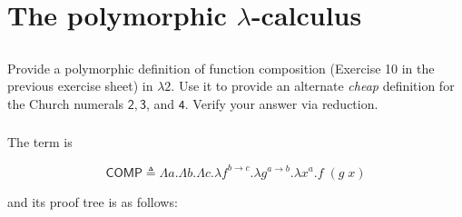 \documentclass{article}
\begin{document}
\section*{The polymorphic $\lambda$-calculus}

\subsection{}\label{ex:6}

Provide a polymorphic definition of function composition
(Exercise 10 in the previous exercise sheet) in $\lambda 2$.
Use it to provide an alternate \textit{cheap} definition for 
the Church numerals $\mathsf{2}, \mathsf{3}$, 
and $\mathsf{4}$. Verify your answer via reduction.

\subsubsection{}

The term is 

$$
\mathsf{COMP} \triangleq
  \Lambda a. \Lambda b. \Lambda c. 
    \lambda f^{b \rightarrow c}.
    \lambda g^{a \rightarrow b}.
    \lambda x^a.
      f\;(g\;x)
$$

and its proof tree is as follows:
\end{document}
